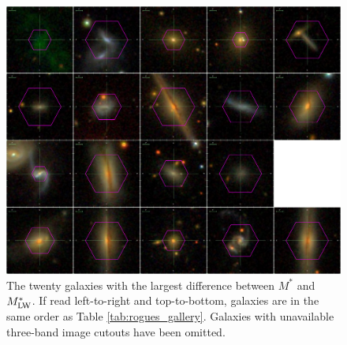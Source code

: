 \begin{figure}
    \centering
    \includegraphics[width=\textwidth]{rogues}
    \caption[The twenty galaxies with the largest difference between $M^*$ and $M^*_{\rm LW}$]{\fixspacing The twenty galaxies with the largest difference between $M^*$ and $M^*_{\rm LW}$. If read left-to-right and top-to-bottom, galaxies are in the same order as Table \ref{tab:rogues_gallery}. Galaxies with unavailable three-band image cutouts have been omitted.}
    \label{fig:rogues_gallery}
\end{figure}